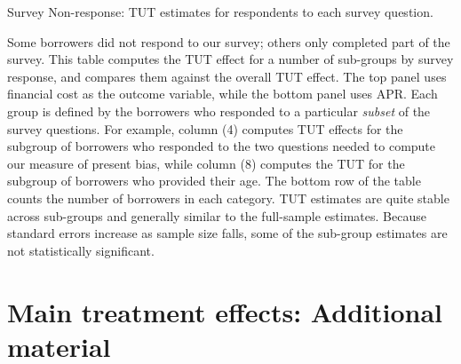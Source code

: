\begin{landscape}
\begin{table}[H]
\caption{Survey Non-response: TUT estimates for respondents to each survey question.}
\label{TUT_cond_survet}
\begin{center}
\scriptsize{}
\end{center}
\scriptsize

Some borrowers did not respond to our survey; others only completed part of the survey.
This table computes the TUT effect for a number of sub-groups by survey response, and compares them against the overall TUT effect.
The top panel uses financial cost as the outcome variable, while the bottom panel uses APR.
Each group is defined by the borrowers who responded to a particular \emph{subset} of the survey questions. 
For example, column (4) computes TUT effects for the subgroup of borrowers who responded to the two questions needed to compute our measure of present bias, while column (8) computes the TUT for the subgroup of borrowers who provided their age.
The bottom row of the table counts the number of borrowers in each category.
TUT estimates are quite stable across sub-groups and generally similar to the full-sample estimates.
Because standard errors increase as sample size falls, some of the sub-group estimates are not statistically significant.
\end{table}
\end{landscape}



\newpage
\section{Main treatment effects: Additional material}


